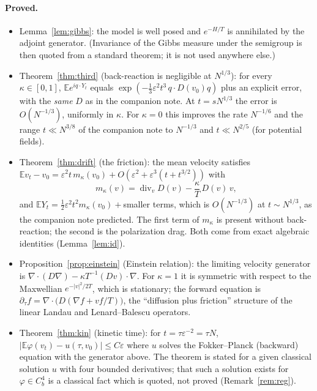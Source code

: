\documentclass[11pt]{article}
\newcommand{\E}{\mathbb{E}}
\newcommand{\eps}{\varepsilon}
\newcommand{\Div}{\operatorname{div}}
\theoremstyle{remark}
\begin{document}
\paragraph{Proved.}
\begin{itemize}
  \item Lemma~\ref{lem:gibbs}: the model is well posed and $e^{-H/T}$ is
    annihilated by the adjoint generator. (Invariance of the Gibbs measure
    under the semigroup is then quoted from a standard theorem; it is not
    used anywhere else.)
  \item Theorem~\ref{thm:third} (back-reaction is negligible at $N^{1/3}$):
    for every $\kappa\in[0,1]$, $\E e^{iq\cdot Y_t}$ equals
    $\exp(-\tfrac13\eps^2t^3\,q\cdot D(v_0)q)$ plus an explicit
    error, with the \emph{same} $D$ as in the companion note. At
    $t=sN^{1/3}$ the error is $O(N^{-1/3})$, uniformly in $\kappa$. For
    $\kappa=0$ this improves the rate $N^{-1/6}$ and the range
    $t\ll N^{3/8}$ of the companion note to $N^{-1/3}$ and $t\ll N^{2/5}$
    (for potential fields).
  \item Theorem~\ref{thm:drift} (the friction): the mean velocity satisfies
    $\E v_t-v_0=\eps^2t\,m_\kappa(v_0)+O(\eps^2+\eps^3(t+t^{3/2}))$ with
    \[
      m_\kappa(v)=\Div_vD(v)-\frac{\kappa}{T}\,D(v)\,v ,
    \]
    and $\E Y_t=\tfrac12\eps^2t^2m_\kappa(v_0)+{}$smaller terms, which is
    $O(N^{-1/3})$ at $t\sim N^{1/3}$, as the companion note predicted. The
    first term of $m_\kappa$ is present without back-reaction; the second is
    the polarization drag. Both come from exact algebraic identities
    (Lemma~\ref{lem:id}).
  \item Proposition~\ref{prop:einstein} (Einstein relation): the limiting
    velocity generator is $\nabla\cdot(D\nabla)-\kappa T^{-1}(Dv)\cdot\nabla$.
    For $\kappa=1$ it is symmetric with respect to the Maxwellian
    $e^{-|v|^2/2T}$, which is stationary; the forward equation is
    $\partial_\tau f=\nabla\cdot\bigl(D(\nabla f+vf/T)\bigr)$, the
    ``diffusion plus friction'' structure of the linear Landau and
    Lenard--Balescu operators.
  \item Theorem~\ref{thm:kin} (kinetic time): for $t=\tau\eps^{-2}=\tau N$,
    $|\E\varphi(v_t)-u(\tau,v_0)|\le C\eps$ where $u$ solves the
    Fokker--Planck (backward) equation with the generator above. The theorem
    is stated for a given classical solution $u$ with four bounded
    derivatives; that such a solution exists for $\varphi\in C_b^4$ is a
    classical fact which is quoted, not proved
    (Remark~\ref{rem:reg}).
\end{itemize}
\end{document}
